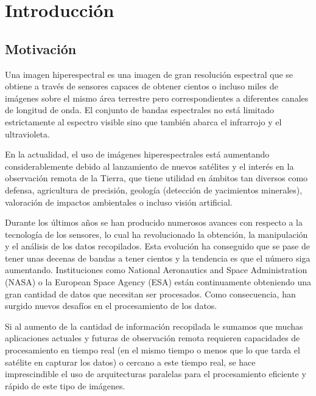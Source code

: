\cleardoublepage
\chapter{Introducción}
\label{ch:chapter1}

\section{Motivación}

Una imagen hiperespectral es una imagen de gran resolución espectral que se obtiene a través de sensores capaces de obtener cientos o incluso miles de imágenes sobre el mismo área terrestre pero correspondientes a diferentes canales de longitud de onda. El conjunto de bandas espectrales no está limitado estrictamente al espectro visible sino que también abarca el infrarrojo y el ultravioleta.

En la actualidad, el uso de imágenes hiperespectrales está aumentando considerablemente debido al lanzamiento de nuevos satélites y el interés en la observación remota de la Tierra, que tiene utilidad en ámbitos tan diversos como defensa, agricultura de precisión, geología (detección de yacimientos minerales), valoración de impactos ambientales o incluso visión artificial.

Durante los últimos años se han producido numerosos avances con respecto a la tecnología de los sensores, lo cual ha revolucionado la obtención, la manipulación y el análisis de los datos recopilados. Esta evolución ha conseguido que se pase de tener unas decenas de bandas a tener cientos y la tendencia es que el número siga aumentando. Instituciones como National Aeronautics and Space Administration (NASA) o la European Space Agency (ESA) están continuamente obteniendo una gran cantidad de datos que necesitan ser procesados. Como consecuencia, han surgido nuevos desafíos en el procesamiento de los datos.


Si al aumento de la cantidad de información recopilada le sumamos que muchas aplicaciones actuales y futuras de observación remota requieren capacidades de procesamiento en tiempo real (en el mismo tiempo o menos que lo que tarda el satélite en capturar los datos) o cercano a este tiempo real, se hace imprescindible el uso de arquitecturas paralelas para el procesamiento eficiente \cite{HPC_aplaza} y rápido de este tipo de imágenes.

